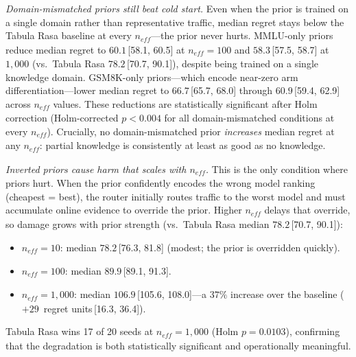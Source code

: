 \emph{Domain-mismatched priors still beat cold start.}
Even when the prior is trained on a single domain rather than
representative traffic, median regret stays below the Tabula Rasa
baseline at every $n_\mathit{eff}$---the prior never hurts.
MMLU-only priors reduce median regret to
$60.1$\,[58.1, 60.5]
at $n_\mathit{eff}{=}100$ and
$58.3$\,[57.5, 58.7]
at $1{,}000$
(vs.\ Tabula Rasa $78.2$\,[70.7, 90.1]),
despite being trained on a single knowledge domain.
GSM8K-only priors---which encode near-zero arm
differentiation---lower median regret to
$66.7$\,[65.7, 68.0]
through
$60.9$\,[59.4, 62.9]
across $n_\mathit{eff}$ values.
These reductions are statistically significant after Holm correction
(Holm-corrected $p < 0.004$ for all domain-mismatched conditions
at every $n_\mathit{eff}$).
Crucially, no domain-mismatched prior \emph{increases} median regret
at any $n_\mathit{eff}$: partial knowledge is consistently at least
as good as no knowledge.

\emph{Inverted priors cause harm that scales with $n_\mathit{eff}$.}
This is the only condition where priors hurt.
When the prior confidently encodes the wrong model ranking
(cheapest = best), the router initially routes traffic to the worst
model and must accumulate online evidence to override the prior.
Higher $n_\mathit{eff}$ delays that override, so damage grows with
prior strength (vs.\ Tabula Rasa median
$78.2$\,[70.7, 90.1]):
\begin{itemize}[nosep,leftmargin=*]
  \item $n_\mathit{eff}{=}10$: median
    $78.2$\,[76.3, 81.8]
    (modest; the prior is overridden quickly).
  \item $n_\mathit{eff}{=}100$: median
    $89.9$\,[89.1, 91.3].
  \item $n_\mathit{eff}{=}1{,}000$: median
    $106.9$\,[105.6, 108.0]---a
    $37\%$ increase over the baseline
    ($+29$~regret units\,[16.3, 36.4]).
\end{itemize}
\noindent
Tabula Rasa wins 17 of 20 seeds
at $n_\mathit{eff}{=}1{,}000$
(Holm $p{=}0.0103$), confirming that the
degradation is both statistically significant and operationally
meaningful.

